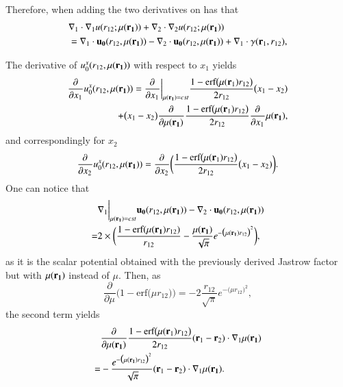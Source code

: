\documentclass[aip,jcp,reprint,noshowkeys,superscriptaddress]{revtex4-1}
\newcommand{\deriv}[3]{\frac{\partial^{#3} #1}{\partial {#2}^{#3}}}
\newcommand{\br}[0]{{\bf {r}}}
\newcommand{\bri}[1]{{\bf r}_{#1}}
\newcommand{\mur}[1]{\mu({\bf r_{#1}})}
\begin{document}
Therefore, when adding  the two derivatives on has that 
\begin{equation}
 \label{eq:lapl_tot}
 \begin{aligned}
& \nabla_1 \cdot \nabla_1 u(r_{12};\mur{1}) + \nabla_2 \cdot \nabla_2 u(r_{12};\mur{1})   \\
&= \nabla_1 \cdot  {\bf u_0}(r_{12},\mur{1}) - \nabla_2 \cdot {\bf u_0}(r_{12},\mur{1}) + \nabla_1 \cdot {\bf \gamma}(\br_1, r_{12}), 
 \end{aligned}
\end{equation}

The derivative of $u_0^x(r_{12},\mur{1})$ with respect to $x_1$ yields 
\begin{equation}
 \begin{aligned}
  \deriv{}{x_1}{} u_0^x(r_{12},\mur{1}) = \deriv{}{x_1}{}\bigg|_{\mur{1}=cst} \frac{1 - \text{erf}\big(\mu(\bri{1}) r_{12} \big)}{2 r_{12}}\big( x_1 - x_2) \\ 
 + \big( x_1 - x_2\big)\deriv{}{\mur{1}}{}\frac{1 - \text{erf}\big(\mu(\bri{1}) r_{12} \big)}{2 r_{12}} \deriv{}{x_1}{} \mur{1},
 \end{aligned}
\end{equation}
and correspondingly for $x_2$ 
\begin{equation}
 \deriv{}{x_2}{} u_0^x(r_{12},\mur{1}) = \deriv{}{x_2}{}\bigg( \frac{1 - \text{erf}\big(\mu(\bri{1}) r_{12} \big)}{2          r_{12}}\big( x_1 - x_2)\bigg).
\end{equation}
One can notice that 
\begin{equation}
 \begin{aligned}
& \nabla_1\bigg|_{\mur{1}=cst} {\bf u_0}(r_{12},\mur{1})  - \nabla_2 \cdot {\bf u_0}(r_{12},\mur{1}) \\
 =& 2 \times \bigg( \frac{1 - \text{erf}(\mur{1} r_{12})}{r_{12}} - \frac{\mur{1}}{\sqrt{\pi}} e^{-\big(\mur{1} r_{12} \big)^2}  \bigg),
 \end{aligned}
\end{equation}
as it is the scalar potential obtained with the previously derived Jastrow factor but with $\mur{1}$ instead of $\mu$. 
Then, as 
\begin{equation}
 \deriv{}{\mu}{} \bigg(1 - \text{erf}\big(\mu r_{12} \big) \bigg) = - 2 \frac{r_{12}}{\sqrt{\pi}} e^{-\big( \mu r_{12}\big)^2},
\end{equation}
the second term yields 
\begin{equation}
 \begin{aligned}
 & \deriv{}{\mur{1}}{}\frac{1 - \text{erf}\big(\mu(\bri{1}) r_{12} \big)}{2 r_{12}} (\br_1 - \br_2) \cdot \nabla_1 \mur{1} \\
=& -\frac{e^{-\big( \mur{1} r_{12}\big)^2}}{\sqrt{\pi}}(\br_1 - \br_2) \cdot \nabla_1 \mur{1}. 
 \end{aligned}
\end{equation}
\end{document}
